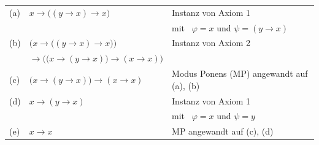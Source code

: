 \documentclass[fontsize=11pt, twoside=false, numbers=autoenddot]{scrbook}
\begin{document}
\par\medskip\noindent
\begin{tabular}{l@{~~}ll@{}}
  (a) & $x \to \big((y \to x) \to x\big)$                          & Instanz von Axiom 1 \\
      &                                                            & mit~ $\varphi = x$ und $\psi = (y \to x)$ \\[12pt]
  (b) & $\Big(x \to \big((y \to x) \to x\big)\Big)$                & Instanz von Axiom 2 \\[-1pt]
      & ${} \to \Big(\big(x \to (y \to x)\big) \to (x \to x)\Big)$ & \raisebox{8pt}{mit~ $\varphi = x$,~ $\psi = (y \to x)$,~ $\vartheta = x$} \\[12pt]
  (c) & $\big(x \to (y \to x)\big) \to (x \to x)$                  & Modus Ponens (MP) angewandt auf (a), (b) \\[12pt]
  (d) & $x \to (y \to x)$                                          & Instanz von Axiom 1 \\
      &                                                            & mit~ $\varphi = x$ und $\psi = y$ \\[12pt]
  (e) & $x \to x$                                                  & MP angewandt auf (c), (d)
\end{tabular}
\end{document}
